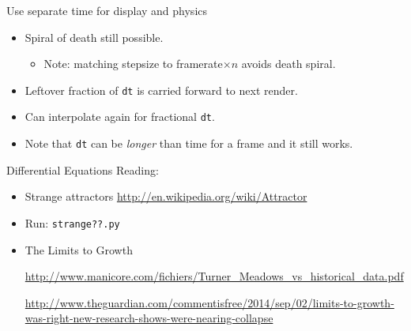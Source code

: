 \documentclass{beamer}
\newcommand{\bframe}[1]{\begin{frame}[fragile]{#1}}
\begin{document}
\bframe{Use separate time for display and physics}
\begin{itemize}
  \begin{Verbatim}[frame=single]
framerate = 30.0
rendertime, physicstime = 0.0, 0.0
dt = 0.01
while !quitting:
  rendertime += clock.tick(framerate) * 0.001
  handle.input()
  while (physicstime < rendertime):
    integrate(state, physicstime, dt)
    physicstime += dt
  display()
\end{Verbatim}
\item Spiral of death still possible.
  \begin{itemize}
  \item Note: matching stepsize to framerate$\times n$ avoids death spiral.
  \end{itemize}
  
  \item Leftover fraction of {\tt dt} is carried forward to next
    render. 
  \item Can interpolate again for fractional {\tt dt}.
\item Note that {\tt dt} can be {\em longer} than time for a frame and it still
  works.
\end{itemize}
\end{frame}


\bframe{Differential Equations}
Reading:
\begin{itemize}
\item Strange attractors
\url{http://en.wikipedia.org/wiki/Attractor}

\item Run: {\tt strange??.py}

\item The Limits to Growth

{
\tiny

\setlength{\parindent}{-1cm}

\url{http://www.manicore.com/fichiers/Turner_Meadows_vs_historical_data.pdf}


\url{http://www.theguardian.com/commentisfree/2014/sep/02/limits-to-growth-was-right-new-research-shows-were-nearing-collapse}


}

\end{itemize}
\end{frame}
\end{document}
